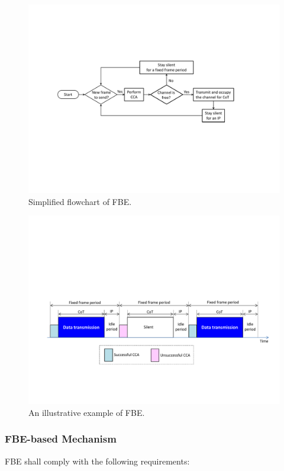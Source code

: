 \documentclass[12pt,onecolumn]{article}
\begin{document}
\begin{figure}[!t]
\centering
\includegraphics[width=0.9\columnwidth]{figures2/FBE-flowchart}
\caption{Simplified flowchart of FBE.}
\label{figs:FBE-flowchart}
\end{figure}

\begin{figure}[!t]
\centering
\includegraphics[width=0.9\columnwidth]{figures2/FBE-example}
\caption{An illustrative example of FBE.}
\label{figs:FBE-example}
\end{figure}

\subsubsection{FBE-based Mechanism}

FBE shall comply with the following requirements:
\end{document}
